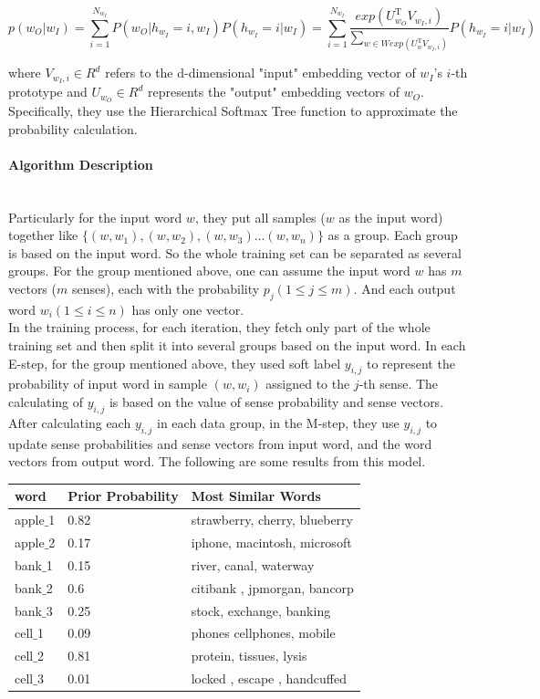 $$p(w_O|w_I)=\sum^{N_{w_I}}_{i=1}P(w_O|h_{w_I}=i,w_I)P(h_{w_I}=i|w_I)=\sum^{N_{w_I}}_{i=1}\frac{exp(U^{\mathrm{T}}_{w_O}V_{w_I,i})}{\sum_{w\in W exp(U^\mathrm{T}_w V_{w_I,i})}}P(h_{w_I}=i|w_I)$$

where $V_{w_I,i}\in R^d$ refers to the d-dimensional "input" embedding vector of $w_I$'s $i$-th prototype and $U_{w_O}\in R^d$ represents the "output" embedding vectors of $w_O$. Specifically, they use the Hierarchical Softmax Tree function to approximate the probability calculation. 

\paragraph{Algorithm Description}\ \\

Particularly for the input word $w$, they put all samples ($w$ as the input word) together like $\{(w, w_1), (w, w_2), (w, w_3) ... (w, w_n)\}$ as a group. Each group is based on the input word. So the whole training set can be separated as several groups. For the group mentioned above, one can assume the input word $w$ has $m$ vectors ($m$ senses), each with the probability $p_j (1 \leq j \leq m)$. And each output word $w_i (1 \leq i\leq n)$ has only one vector. \\

 In the training process, for each iteration, they fetch only part of the whole training set and then split it into several groups based on the input word. In each E-step, for the group mentioned above, they used soft label $y_{i,j}$ to represent the probability of input word in sample $(w,w_i)$ assigned to the $j$-th sense. The calculating of $y_{i,j}$ is based on the value of sense probability and sense vectors. After calculating each $y_{i,j}$ in each data group, in the M-step, they use $y_{i,j}$ to update sense probabilities and sense vectors from input word, and the word vectors from output word. The following are some results from this model.


\begin{tabular}{|l|l|l|}
  \hline
  word & Prior Probability & Most Similar Words \\
  \hline  
  apple$\_$1 & 0.82 & strawberry, cherry, blueberry\\
  \hline
  apple$\_$2 & 0.17 & iphone, macintosh, microsoft\\
  \hline
  bank$\_$1 & 0.15 & river, canal, waterway\\
  \hline
  bank$\_$2 & 0.6 & citibank , jpmorgan, bancorp\\
  \hline
  bank$\_$3 & 0.25 & stock, exchange, banking\\
  \hline
  cell$\_$1 & 0.09 & phones cellphones, mobile\\
  \hline
  cell$\_$2 & 0.81 & protein, tissues, lysis\\
  \hline
  cell$\_$3 & 0.01 &locked , escape , handcuffed\\
  \hline
 \end{tabular}